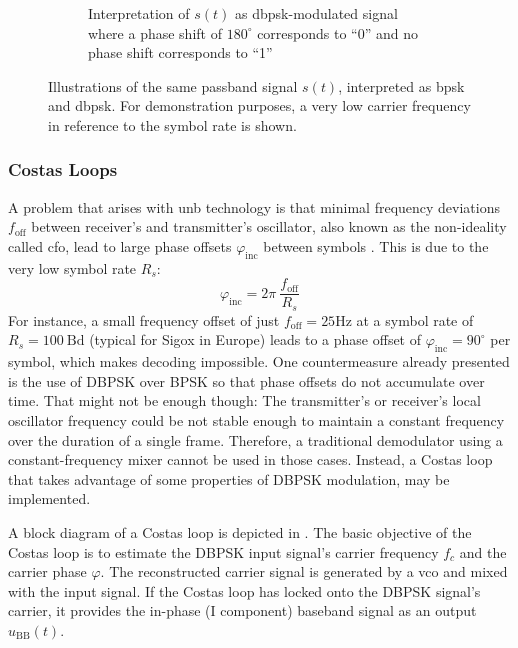 \begin{figure}[h]
\begin{subfigure}[c]{1.0\textwidth}
\caption{Interpretation of $s(t)$ as \gls{dbpsk}-modulated signal where a phase shift of $180^\circ$ corresponds to ``0'' and no phase shift corresponds to ``1''}
\label{fig:dbpsk_demo}
\end{subfigure}
\caption{Illustrations of the same passband signal $s(t)$, interpreted as \gls{bpsk} and \gls{dbpsk}. For demonstration purposes, a very low carrier frequency in reference to the symbol rate is shown.}
\end{figure}

\subsubsection{Costas Loops}
A problem that arises with \gls{unb} technology is that minimal frequency deviations $f_{\mathrm{off}}$ between receiver's and transmitter's oscillator, also known as the non-ideality called \gls{cfo}, lead to large phase offsets $\varphi_{\mathrm{inc}}$ between symbols \cite[Section 3.1]{phyandmac}.
This is due to the very low symbol rate $R_s$:
\begin{equation}
	\varphi_{\mathrm{inc}} = 2 \pi ~ \frac{f_{\mathrm{off}}}{R_s}
\end{equation}
For instance, a small frequency offset of just $f_{\mathrm{off}} = 25 \mathrm{Hz}$ at a symbol rate of $R_s = 100 ~\mathrm{Bd}$ (typical for Sigox in Europe) leads to a phase offset of $\varphi_{\mathrm{inc}} = 90^\circ$ per symbol, which makes decoding impossible.
One countermeasure already presented is the use of DBPSK over BPSK so that phase offsets do not accumulate over time.
That might not be enough though: The transmitter's or receiver's local oscillator frequency could be not stable enough to maintain a constant frequency over the duration of a single frame.
Therefore, a traditional demodulator using a constant-frequency mixer cannot be used in those cases.
Instead, a Costas loop that takes advantage of some properties of DBPSK modulation, may be implemented.

A block diagram of a Costas loop is depicted in .
The basic objective of the Costas loop is to estimate the DBPSK input signal's carrier frequency $f_c$ and the carrier phase $\hat \varphi$.
The reconstructed carrier signal is generated by a \gls{vco} and mixed with the input signal.
If the Costas loop has locked onto the DBPSK signal's carrier, it provides the in-phase (I component) baseband signal as an output $u_\mathrm{BB}(t)$.

